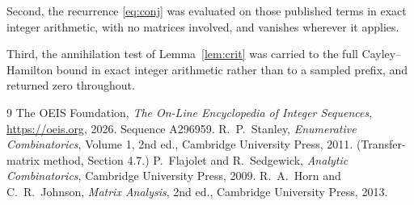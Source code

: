 \documentclass[11pt,a4paper]{article}
\theoremstyle{plain}
\theoremstyle{definition}
\begin{document}
Second, the recurrence \eqref{eq:conj} was evaluated on those published terms in exact
integer arithmetic, with no matrices involved, and vanishes wherever it applies.

Third, the annihilation test of Lemma~\ref{lem:crit} was carried to the full
Cayley--Hamilton bound in exact integer arithmetic rather than to a sampled prefix, and
returned zero throughout.

\begin{thebibliography}{9}
 The OEIS Foundation, \emph{The On-Line Encyclopedia of Integer
Sequences}, \url{https://oeis.org}, 2026. Sequence A296959.
 R.~P.~Stanley, \emph{Enumerative Combinatorics}, Volume 1, 2nd ed.,
Cambridge University Press, 2011. (Transfer-matrix method, Section 4.7.)
 P.~Flajolet and R.~Sedgewick, \emph{Analytic Combinatorics}, Cambridge
University Press, 2009.
 R.~A.~Horn and C.~R.~Johnson, \emph{Matrix Analysis}, 2nd ed., Cambridge
University Press, 2013.
\end{thebibliography}
\end{document}
